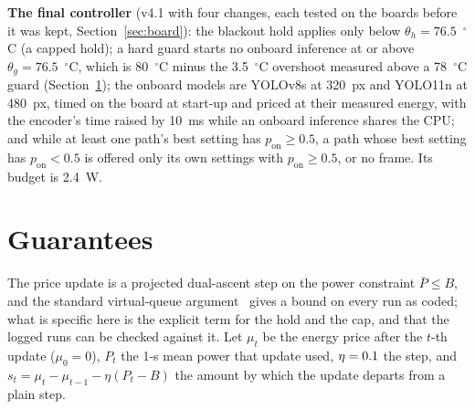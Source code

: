 \documentclass[conference]{IEEEtran}
\begin{document}
\textbf{The final controller} (v4.1 with four changes, each tested on the boards before it was kept,
Section~\ref{sec:board}): the blackout hold applies only below $\theta_h = 76.5$~$^\circ$C (a capped hold); a hard guard
starts no onboard inference at or above $\theta_g = 76.5$~$^\circ$C, which is 80~$^\circ$C minus the 3.5~$^\circ$C
overshoot measured above a 78~$^\circ$C guard (Section~\ref{sec:theory}); the onboard models are YOLOv8s at 320~px and YOLO11n at 480~px, timed on the
board at start-up and priced at their measured energy, with the encoder's time raised by 10~ms while an onboard
inference shares the CPU; and while at least one path's best setting has $p_{\mathrm{on}} \ge 0.5$, a path whose best
setting has $p_{\mathrm{on}} < 0.5$ is offered only its own settings with $p_{\mathrm{on}} \ge 0.5$, or no frame. Its
budget is 2.4~W.

\section{Guarantees}\label{sec:theory}
The price update is a projected dual-ascent step on the power constraint $\bar P \le B$, and the standard virtual-queue
argument~\cite{Neely_2010} gives a bound on every run as coded; what is specific here is the explicit term for the hold
and the cap, and that the logged runs can be checked against it. Let $\mu_t$ be the energy price after the $t$-th
update ($\mu_0 = 0$), $P_t$ the 1-s mean power that update used, $\eta = 0.1$ the step, and
$s_t = \mu_t - \mu_{t-1} - \eta (P_t - B)$ the amount by which the update departs from a plain step.
\end{document}
